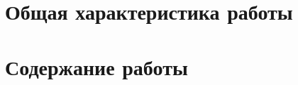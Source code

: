 \section*{Общая характеристика работы}

\newcommand{\actuality}{\pdfbookmark[1]{Актуальность}{actuality}\underline{\textbf{\actualityTXT}}}
\newcommand{\progress}{\pdfbookmark[1]{Разработанность темы}{progress}\underline{\textbf{\progressTXT}}}
\newcommand{\aim}{\pdfbookmark[1]{Цели}{aim}\underline{{\textbf\aimTXT}}}
\newcommand{\tasks}{\pdfbookmark[1]{Задачи}{tasks}\underline{\textbf{\tasksTXT}}}
\newcommand{\aimtasks}{\pdfbookmark[1]{Цели и задачи}{aimtasks}\aimtasksTXT}
\newcommand{\novelty}{\pdfbookmark[1]{Научная новизна}{novelty}\underline{\textbf{\noveltyTXT}}}
\newcommand{\influence}{\pdfbookmark[1]{Практическая значимость}{influence}\underline{\textbf{\influenceTXT}}}
\newcommand{\methods}{\pdfbookmark[1]{Методология и методы исследования}{methods}\underline{\textbf{\methodsTXT}}}
\newcommand{\defpositions}{\pdfbookmark[1]{Положения, выносимые на защиту}{defpositions}\underline{\textbf{\defpositionsTXT}}}
\newcommand{\reliability}{\pdfbookmark[1]{Достоверность}{reliability}\underline{\textbf{\reliabilityTXT}}}
\newcommand{\probation}{\pdfbookmark[1]{Апробация}{probation}\underline{\textbf{\probationTXT}}}
\newcommand{\contribution}{\pdfbookmark[1]{Личный вклад}{contribution}\underline{\textbf{\contributionTXT}}}
\newcommand{\publications}{\pdfbookmark[1]{Публикации}{publications}\underline{\textbf{\publicationsTXT}}}




\section*{Содержание работы}


